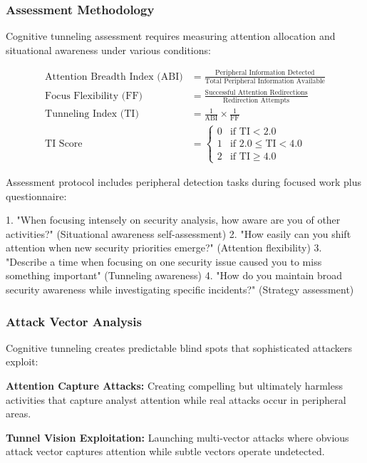 \documentclass[11pt,a4paper]{article}
\begin{document}
\subsubsection{Assessment Methodology}

Cognitive tunneling assessment requires measuring attention allocation and situational awareness under various conditions:

\begin{align}
\text{Attention Breadth Index (ABI)} &= \frac{\text{Peripheral Information Detected}}{\text{Total Peripheral Information Available}} \\
\text{Focus Flexibility (FF)} &= \frac{\text{Successful Attention Redirections}}{\text{Redirection Attempts}} \\
\text{Tunneling Index (TI)} &= \frac{1}{\text{ABI}} \times \frac{1}{\text{FF}} \\
\text{TI Score} &= \begin{cases}
0 & \text{if TI} < 2.0 \\
1 & \text{if } 2.0 \leq \text{TI} < 4.0 \\
2 & \text{if TI} \geq 4.0
\end{cases}
\end{align}

Assessment protocol includes peripheral detection tasks during focused work plus questionnaire:

1. "When focusing intensely on security analysis, how aware are you of other activities?" (Situational awareness self-assessment)
2. "How easily can you shift attention when new security priorities emerge?" (Attention flexibility)
3. "Describe a time when focusing on one security issue caused you to miss something important" (Tunneling awareness)
4. "How do you maintain broad security awareness while investigating specific incidents?" (Strategy assessment)

\subsubsection{Attack Vector Analysis}

Cognitive tunneling creates predictable blind spots that sophisticated attackers exploit:

\textbf{Attention Capture Attacks:} Creating compelling but ultimately harmless activities that capture analyst attention while real attacks occur in peripheral areas.

\textbf{Tunnel Vision Exploitation:} Launching multi-vector attacks where obvious attack vector captures attention while subtle vectors operate undetected.
\end{document}
